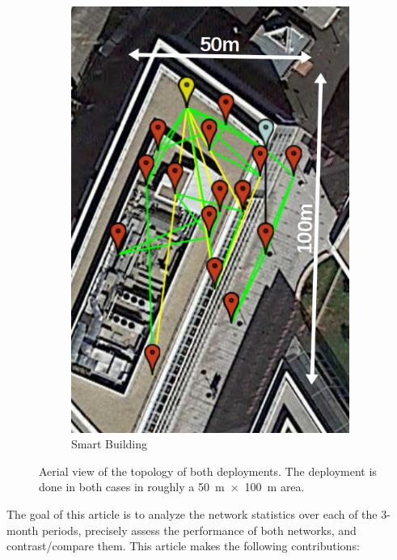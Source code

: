 \documentclass{elsarticle}
\newcommand{\building}            {Smart Building\xspace}
\begin{document}
\begin{figure}
\begin{subfigure}[h]{0.27\textwidth}
        \includegraphics[width=\textwidth]{evalab_map_annotated}
        \caption{\building}
        \label{fig:building_map}
    \end{subfigure} 
    \caption{
        Aerial view of the topology of both deployments.
        The deployment is done in both cases in roughly a 50~m~$\times$~100~m area.
    }
    \label{fig:maps}
\end{figure}


The goal of this article is to analyze the network statistics over each of the 3-month periods, precisely assess the performance of both networks, and contrast/compare them.
This article makes the following contributions:
\end{document}
